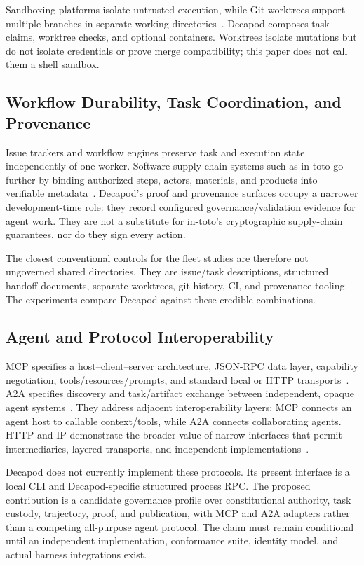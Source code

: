 Sandboxing platforms isolate untrusted execution, while Git worktrees support multiple branches in separate working directories~\cite{gitworktree}. Decapod composes task claims, worktree checks, and optional containers. Worktrees isolate mutations but do not isolate credentials or prove merge compatibility; this paper does not call them a shell sandbox.

\subsection{Workflow Durability, Task Coordination, and Provenance}
Issue trackers and workflow engines preserve task and execution state independently of one worker. Software supply-chain systems such as in-toto go further by binding authorized steps, actors, materials, and products into verifiable metadata~\cite{torresarias2019intoto}. Decapod's proof and provenance surfaces occupy a narrower development-time role: they record configured governance/validation evidence for agent work. They are not a substitute for in-toto's cryptographic supply-chain guarantees, nor do they sign every action.

The closest conventional controls for the fleet studies are therefore not ungoverned shared directories. They are issue/task descriptions, structured handoff documents, separate worktrees, git history, CI, and provenance tooling. The experiments compare Decapod against these credible combinations.

\subsection{Agent and Protocol Interoperability}
MCP specifies a host--client--server architecture, JSON-RPC data layer, capability negotiation, tools/resources/prompts, and standard local or HTTP transports~\cite{mcp2025architecture}. A2A specifies discovery and task/artifact exchange between independent, opaque agent systems~\cite{a2a2026spec}. They address adjacent interoperability layers: MCP connects an agent host to callable context/tools, while A2A connects collaborating agents. HTTP and IP demonstrate the broader value of narrow interfaces that permit intermediaries, layered transports, and independent implementations~\cite{rfc9110http,rfc791ip}.

Decapod does not currently implement these protocols. Its present interface is a local CLI and Decapod-specific structured process RPC. The proposed contribution is a candidate governance profile over constitutional authority, task custody, trajectory, proof, and publication, with MCP and A2A adapters rather than a competing all-purpose agent protocol. The claim must remain conditional until an independent implementation, conformance suite, identity model, and actual harness integrations exist.

